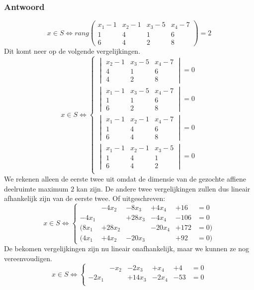 \documentclass[main.tex]{subfiles}
\begin{document}
\subsubsection*{Antwoord}
\[
x \in S \Leftrightarrow
rang
\begin{pmatrix}
  x_{1}-1 & x_{2}-1 & x_{3}-5 & x_{4}-7\\
  1 & 4 & 1 & 6\\
  6 & 4 & 2 & 8
\end{pmatrix}
= 2
\]
Dit komt neer op de volgende vergelijkingen.
\[
x \in S \Leftrightarrow
\left\{
  \begin{array}{c}
    \begin{vmatrix}
      x_{2}-1 & x_{3}-5 & x_{4}-7\\
      4 & 1 & 6\\
      4 & 2 & 8
    \end{vmatrix}
    = 0\\
    \begin{vmatrix}
      x_{1}-1  & x_{3}-5 & x_{4}-7\\
      1 & 1 & 6\\
      6 & 2 & 8
    \end{vmatrix}
    =0\\
    \begin{vmatrix}
      x_{1}-1 & x_{2}-1 & x_{4}-7\\
      1 & 4 & 6\\
      6 & 4 & 8
    \end{vmatrix}
    = 0\\
    \begin{vmatrix}
      x_{1}-1 & x_{2}-1 & x_{3}-5\\
      1 & 4 & 1 \\
      6 & 4 & 2 
    \end{vmatrix}
    = 0\\
  \end{array}
\right.
\]
We rekenen alleen de eerste twee uit omdat de dimensie van de gezochte affiene deelruimte maximum $2$ kan zijn.
De andere twee vergelijkingen zullen dus lineair afhankelijk zijn van de eerste twee.
Of uitgeschreven:
\[
x \in S \Leftrightarrow
\left\{
\begin{array}{cccccc}
          &-4x_{2} &-8x_{3}  &+ 4x_{4} &+16 &= 0\\
  -4x_{1} &        &+28x_{3} &-4x_{4} &-106 &= 0\\
(8x_{1} &+28x_{2} &        &-20x_{4} &+172 &=0)\\
(4x_{1}  &+4x_{2} &- 20x_{3} &        &+92 &=0)
\end{array}
\right.
\]
De bekomen vergelijkingen zijn nu lineair onafhankelijk, maar we kunnen ze nog vereenvoudigen.
\[
x \in S \Leftrightarrow
\left\{
\begin{array}{cccccc}
          &-x_{2} &-2x_{3}  &+ x_{4} &+4 &= 0\\
  -2x_{1} &        &+14x_{3} &-2x_{4} &-53 &= 0\\
\end{array}
\right.
\]
\end{document}
